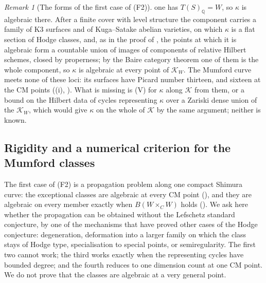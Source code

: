 \documentclass[11pt,reqno]{amsart}
\theoremstyle{plain}
\theoremstyle{definition}
\theoremstyle{remark}
\newtheorem{remark}[theorem]{Remark}
\newcommand{\QQ}{\mathbb{Q}}
\newcommand{\cK}{\mathcal{K}}
\begin{document}
\begin{remark}[The forms of the first case of (F2)]
one has $T(S)_{\QQ}=W$, so $\kappa$ is algebraic there. After a finite cover
with level structure the component carries a family of K3 surfaces and of
Kuga--Satake abelian varieties, on which $\kappa$ is a flat section of Hodge
classes, and, as in the proof of , the points at which it
is algebraic form a countable union of images of components of relative
Hilbert schemes, closed by properness; by the Baire category theorem one of
them is the whole component, so $\kappa$ is algebraic at every point of
$\cK_{W}$. The Mumford curve meets none of these loci: its surfaces have
Picard number thirteen, and sixteen at the CM points
((i), ). What is missing is
\textup{(V)} for $\kappa$ along $\cK$ from them, or a bound on the Hilbert data
of cycles representing $\kappa$ over a Zariski dense union of the $\cK_{W}$,
which would give $\kappa$ on the whole of $\cK$ by the same argument; neither
is known.
\end{remark}
\subsection{Rigidity and a numerical criterion for the Mumford
classes}\label{ssec:mumfordrigid}

The first case of (F2) is a propagation problem along one compact Shimura
curve: the exceptional classes are algebraic at every CM point
(), and they are algebraic on every member exactly when
$B(W\times_{C}W)$ holds (). We ask here whether the
propagation can be obtained without the Lefschetz standard conjecture, by one
of the mechanisms that have proved other cases of the Hodge conjecture:
degeneration, deformation into a larger family on which the class stays of
Hodge type, specialisation to special points, or semiregularity. The first
two cannot work; the third works exactly when the representing cycles have
bounded degree; and the fourth reduces to one dimension count at one CM
point. We do not prove that the classes are algebraic at a very general
point.
\end{document}
